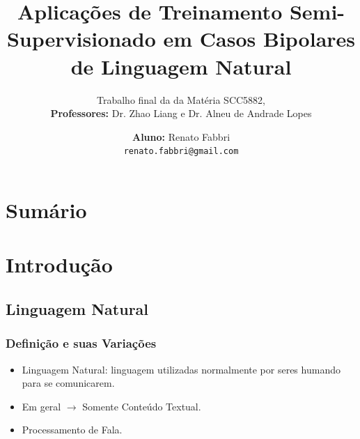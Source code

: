\documentclass{beamer}
\title{Aplicações de Treinamento Semi-Supervisionado em Casos Bipolares de Linguagem Natural}
\subtitle{Trabalho final da da Matéria SCC5882, \\ {\bf Professores:} Dr. Zhao Liang e Dr. Alneu de Andrade Lopes}
\author[Renato Fabbri]{{\bf Aluno:} Renato Fabbri  \\ \texttt{renato.fabbri@gmail.com}}
\institute{IFSC-USP}
\begin{document}
  \frame{\titlepage}
  \section*{Sumário}
  \frame{\tableofcontents}
  \section{Introdução}
    \frame{\tableofcontents[current]}
    \subsection{Linguagem Natural}
    \frame
    {
      \frametitle{Definição e suas Variações}
      \begin{itemize}
        \item Linguagem Natural: linguagem utilizadas normalmente por seres humando para se comunicarem.
        \item Em geral $\rightarrow$ Somente Conteúdo Textual.
        \item Processamento de Fala.
      \end{itemize}
    }
\end{document}
